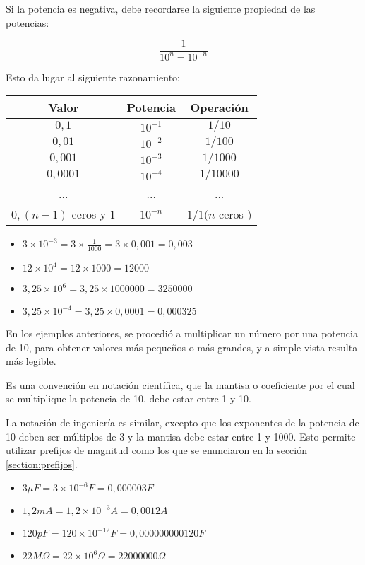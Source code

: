 Si la potencia es negativa, debe recordarse la siguiente propiedad de las potencias:

$$ \frac{1}{10^{n}=10^{-n}} $$

Esto da lugar al siguiente razonamiento:

\begin{tabular}{|c|c|c|}
\hline 
Valor & Potencia & Operación \\ 
\hline 
$0,1$ & $10^{-1}$ & $1/10$ \\ 
\hline 
$0,01$ & $10^{-2}$ & $1/100$ \\ 
\hline 
$0,001$ & $10^{-3}$ & $1/1000$ \\ 
\hline 
$0,0001$ & $10^{-4}$ & $1/10000$ \\ 
\hline 
... & ... & ... \\ 
\hline 
$0,(n-1)$ ceros y $1$ & $10^{-n}$ & $1/1(n$ ceros $)$ \\ 
\hline 
\end{tabular}

\begin{ejemplo}
	\begin{itemize}
		\item $ 3 \times 10^{-3}=3\times \frac{1}{1000}=3\times 0,001 = 0,003 $
		\item $ 12 \times 10^{4}= 12 \times 1000 = 12000 $
		\item $ 3,25 \times 10^{6} = 3,25 \times 1000000 = 3250000 $
		\item $ 3,25 \times 10^{-4}= 3,25 \times 0,0001 = 0,000325 $
	\end{itemize}
\end{ejemplo}

En los ejemplos anteriores, se procedió a multiplicar un número por una potencia de 10, para obtener valores más pequeños o más grandes, y a simple vista resulta más legible.

Es una convención en notación científica, que la mantisa o coeficiente por el cual se multiplique la potencia de 10, debe estar entre 1 y 10.

La notación de ingeniería es similar, excepto que los exponentes de la potencia de 10 deben ser múltiplos de 3 y la mantisa debe estar entre 1 y 1000. Esto permite utilizar prefijos de magnitud como los que se enunciaron en la sección \ref{section:prefijos}.

\begin{ejemplo}
	\begin{itemize}
	Convertir las siguientes medidas para eliminar los prefijos, según la tabla de la sección \ref{section:prefijos}.
		\item $ 3 \mu F = 3\times 10^{-6} F=0,000003 F$
		\item $ 1,2 mA = 1,2 \times 10^{-3} A= 0,0012 A$
		\item $ 120 pF = 120 \times 10^{-12} F=0,000000000120 F$
		\item $ 22 M\Omega = 22 \times 10^{6} \Omega = 22000000 \Omega $
	\end{itemize}
\end{ejemplo}

